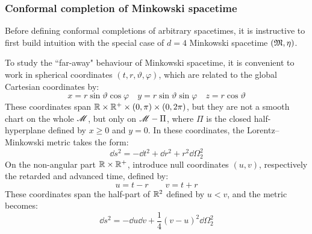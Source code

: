 \subsubsection{Conformal completion of Minkowski spacetime}

Before defining conformal completions of arbitrary spacetimes, it is instructive to first build intuition with the special case of $ d = 4 $ Minkowski spacetime $ (\mathfrak{M},\eta) $.

To study the ``far-away" behaviour of Minkowski spacetime, it is convenient to work in spherical coordinates $ (t , r , \vartheta , \varphi) $, which are related to the global Cartesian coordinates by:
\begin{equation*}
  x = r \sin \vartheta \cos \varphi
  \quad
  y = r \sin \vartheta \sin \varphi
  \quad
  z = r \cos \vartheta
\end{equation*}
These coordinates span $ \mathbb{R} \times \mathbb{R}^+ \times (0 , \pi) \times (0 , 2\pi) $, but they are not a smooth chart on the whole $ \mathscr{M} $, but only on $ \mathscr{M} - \Pi $, where $ \Pi $ is the closed half-hyperplane defined by $ x \geq 0 $ and $ y = 0 $. In these coordinates, the Lorentz--Minkowski metric takes the form:
\begin{equation*}
  \dd s^2 = - \dd t^2 + \dd r^2 + r^2 \dd \Omega_2^2
\end{equation*}
On the non-angular part $ \mathbb{R} \times \mathbb{R}^+ $, introduce null coordinates $ (u,v) $, respectively the retarded and advanced time, defined by:
\begin{equation*}
  u = t - r
  \qquad
  v = t + r
\end{equation*}
These coordinates span the half-part of $ \mathbb{R}^2 $ defined by $ u < v $, and the metric becomes:
\begin{equation*}
  \dd s^2 = - \dd u \dd v + \frac{1}{4} (v - u)^2 \dd \Omega_2^2
\end{equation*}

